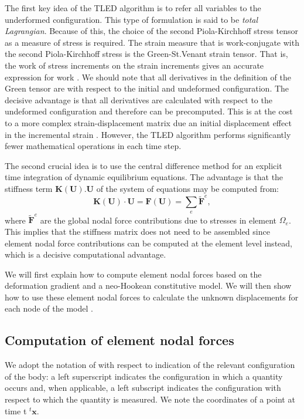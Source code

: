 The first key idea of the TLED algorithm is to refer all variables to the underformed configuration. This type of formulation is said to be \emph{total Lagrangian}. Because of this, the choice of the second Piola-Kirchhoff stress tensor as a measure of stress is required. The strain measure that is work-conjugate with the second Piola-Kirchhoff stress is the Green-St.Venant strain tensor. That is,  the work of stress increments on the strain increments gives an accurate expression for work \citep{Ji10}. We should note that all derivatives in the definition of the Green tensor are with respect to the initial and undeformed configuration. The decisive advantage is that all derivatives are calculated with respect to the undeformed configuration and therefore can be precomputed. This is at the cost to a more complex strain-displacement matrix due an initial displacement effect in the incremental strain \citep{Bathe95}. However, the TLED algorithm performs significantly fewer mathematical operations in each time step. 

The second crucial idea is to use the central difference method for an explicit time integration of dynamic equilibrium equations. The advantage is that the stiffness term $ \mathbf{K(\mathbf{U}).\mathbf{U}} $ of the system of equations may be computed from:
\begin{equation}
\mathbf{K(\mathbf{U}) \cdot \mathbf{U}} = \mathbf{F}(\mathbf{U}) = \sum_e \mathbf{\tilde{F}}^e,
\end{equation}
where $ \mathbf{\tilde{F}}^e $ are the global nodal force contributions due to stresses in element $ \Omega_e $. This implies that the stiffness matrix does not need to be assembled since element nodal force contributions can be computed at the element level instead, which is a decisive computational advantage. 

We will first explain how to compute element nodal forces based on the deformation gradient and a neo-Hookean constitutive model. We will then show how to use these element nodal forces to calculate the unknown displacements for each node of the model \citep{Taylor06}. 


	\subsection{Computation of element nodal forces} 
	
We adopt the notation of \citeauthor{Bathe95} with respect to indication of the relevant configuration of the body: a left superscript indicates the configuration in which a quantity occurs and, when applicable, a left subscript indicates the configuration with respect to which the quantity is measured. We note the coordinates of a point at time t $ ^t \mathbf{x}$.

